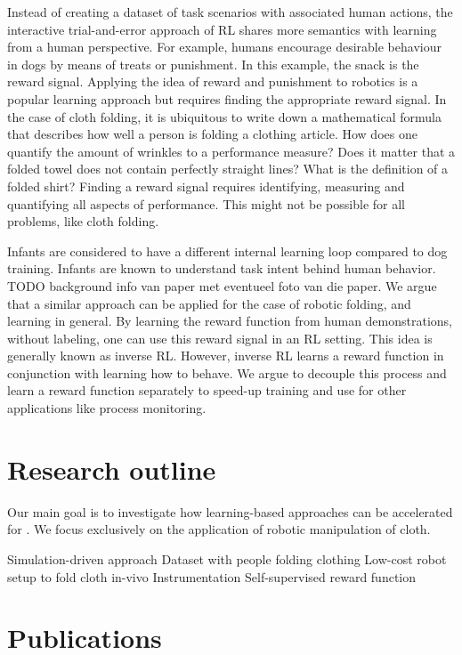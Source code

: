 \documentclass[\home/main.tex]{subfiles}
\begin{document}
Instead of creating a dataset of task scenarios with associated human actions, the interactive trial-and-error approach of \gls{RL} shares more semantics with learning from a human perspective. For example, humans encourage desirable behaviour in dogs by means of treats or punishment. In this example, the snack is the reward signal. Applying the idea of reward and punishment to robotics is a popular learning approach but requires finding the appropriate reward signal. In the case of cloth folding, it is ubiquitous to write down a mathematical formula that describes how well a person is folding a clothing article. How does one quantify the amount of wrinkles to a performance measure? Does it matter that a folded towel does not contain perfectly straight lines? What is the definition of a folded shirt? Finding a reward signal requires identifying, measuring and quantifying all aspects of performance. This might not be possible for all problems, like cloth folding. 

Infants are considered to have a different internal learning loop compared to dog training. Infants are known to understand task intent behind human behavior. TODO background info van paper met eventueel foto van die paper. 
We argue that a similar approach can be applied for the case of robotic folding, and learning in general. By learning the reward function from human demonstrations, without labeling, one can use this reward signal in an \gls{RL} setting. This idea is generally known as inverse \gls{RL}. However, inverse RL learns a reward function in conjunction with learning how to behave. We argue to decouple this process and learn a reward function separately to speed-up training and use for other applications like process monitoring. 

\section{Research outline}
Our main goal is to investigate how learning-based approaches can be accelerated for . We focus exclusively on the application of robotic manipulation of cloth.

Simulation-driven approach
Dataset with people folding clothing
Low-cost robot setup to fold cloth in-vivo
Instrumentation
Self-supervised reward function

\section{Publications}
\end{document}
